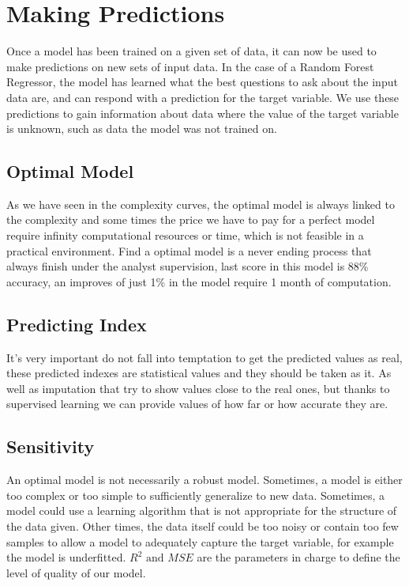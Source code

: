 \documentclass[a4project, twocolumn]{article}
\begin{document}
\section{Making Predictions}

Once a model has been trained on a given set of data, it can now be used to make predictions on new sets of input data. In the case of a Random Forest Regressor, the model has learned what the best questions to ask about the input data are, and can respond with a prediction for the target variable. We use these predictions to gain information about data where the value of the target variable is unknown, such as data the model was not trained on.

\subsection{Optimal Model}

As we have seen in the complexity curves, the optimal model is always linked to the complexity and some times the price we have to pay for a perfect model require infinity computational resources or time, which is not feasible in a practical environment. Find a optimal model is a never ending process that always finish under the analyst supervision, last score in this model is 88\% accuracy, an improves of just 1\% in the model require 1 month of computation.

\subsection{Predicting Index}

It's very important do not fall into temptation to get the predicted values as real, these predicted indexes are statistical values and they should be taken as it. As well as imputation that try to show values close to the real ones, but thanks to supervised learning we can provide values of how far or how accurate they are.

\subsection{Sensitivity}

An optimal model is not necessarily a robust model. Sometimes, a model is either too complex or too simple to sufficiently generalize to new data. Sometimes, a model could use a learning algorithm that is not appropriate for the structure of the data given. Other times, the data itself could be too noisy or contain too few samples to allow a model to adequately capture the target variable, for example the model is underfitted. $R^2 \text{ and } MSE$ are the parameters in charge to define the level of quality of our model.
\end{document}
